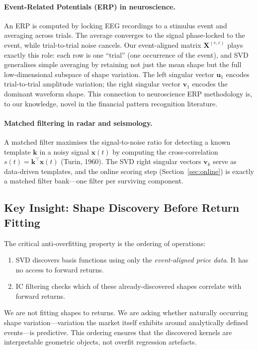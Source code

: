 \documentclass[11pt,a4paper]{article}
\theoremstyle{definition}
\theoremstyle{plain}
\newcommand{\Xmat}{\mathbf{X}}
\newcommand{\bvec}[1]{\mathbf{#1}}
\begin{document}
\paragraph{Event-Related Potentials (ERP) in neuroscience.}
An ERP is computed by locking EEG recordings to a stimulus event and
averaging across trials. The average converges to the signal phase-locked to
the event, while trial-to-trial noise cancels. Our event-aligned matrix
$\Xmat^{(e,c)}$ plays exactly this role: each row is one ``trial'' (one
occurrence of the event), and SVD generalises simple averaging by retaining
not just the mean shape but the full low-dimensional subspace of shape
variation. The left singular vector $\bvec{u}_1$ encodes trial-to-trial
amplitude variation; the right singular vector $\bvec{v}_1$ encodes the
dominant waveform shape. This connection to neuroscience ERP methodology is,
to our knowledge, novel in the financial pattern recognition literature.

\paragraph{Matched filtering in radar and seismology.}
A matched filter maximises the signal-to-noise ratio for detecting a known
template $\bvec{k}$ in a noisy signal $\bvec{x}(t)$ by computing the
cross-correlation $s(t) = \bvec{k}^\top \bvec{x}(t)$ (Turin, 1960). The
SVD right singular vectors $\bvec{v}_k$ serve as data-driven templates, and
the online scoring step (Section~\ref{sec:online}) is exactly a matched
filter bank---one filter per surviving component.

\subsection{Key Insight: Shape Discovery Before Return Fitting}

The critical anti-overfitting property is the ordering of operations:
\begin{enumerate}
    \item SVD discovers basis functions using only the \emph{event-aligned
          price data}. It has no access to forward returns.
    \item IC filtering checks which of these already-discovered shapes
          correlate with forward returns.
\end{enumerate}
We are not fitting shapes to returns. We are asking whether naturally
occurring shape variation---variation the market itself exhibits around
analytically defined events---is predictive. This ordering ensures that the
discovered kernels are interpretable geometric objects, not overfit
regression artefacts.
\end{document}
